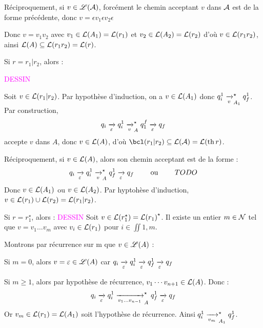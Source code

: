 \documentclass[a4paper,french,bookmarks]{book}
\begin{document}
\begin{nproof}
\begin{enumerate}
        
        Réciproquement, si $v\in \mathscr{L}(\mathcal{A})$, forcément le chemin acceptant $v$ dans $\mathcal{A}$ est de la forme précédente, donc $v= \epsilon v_1 \epsilon v_2  \epsilon $
        
        
        Donc $v = v_1v_2$ avec $v_1 \in \mathcal{L}\!\left(A_1\right) = \mathcal{L}\!\left(r_1\right)$ et $v_2 \in \mathcal{L}\!\left(A_2\right) = \mathcal{L}\!\left(r_2\right)$ d'où $v \in \mathcal{L}\!\left(r_1r_2\right)$, ainsi $\mathcal{L}\!\left(A\right) \subseteq \mathcal{L}\!\left(r_1r_2\right) = \mathcal{L}\!\left(r\right)$.
        
            \itt Si $r = r_1 \vert r_2$, alors :
            
            \textcolor{magenta}{DESSIN}
            
            Soit $v \in \mathcal{L}\!\left(r_1 \vert r_2\right)$. Par hypothèse d'induction, on a $v \in \mathcal{L}\!\left(A_1\right)$ donc $q_i^1 \lima{v}_{A_1}^\star q_f^1$. Par construction, 
            \[ q_i \lima{\epsilon} q_i^1 \lima{v}_A^\star q_1^f \lima{\epsilon} q_f\]
            accepte $v$ dans $A$, donc $v \in \mathcal{L}\!\left(A\right)$, d'où $\bcl\p{r_1 \vert r_2} \subseteq \bcL\p{\bcA} = \bcL\p{\th r}$.
            
            Réciproquement, si $v \in \mathcal{L}\!\left(A\right)$, alors son chemin acceptant est de la forme :
            \[ q_i \lima{\epsilon} q_i^1 \lima{v}_{A}^\star q_f^1 \lima{\epsilon} q_f \qquad\ou\qquad TODO\]
            Donc $v \in \mathcal{L}\!\left(A_1\right)$ ou $v \in \mathcal{L}\!\left(A_2\right)$. Par hyptohèse d'induction, $v \in \mathcal{L}\!\left(r_1\right) \cup \mathcal{L}\!\left(r_2\right) = \mathcal{L}\!\left(r_1 \vert r_2\right)$.
            
            \itt Si $r = r_1^\star$, alors :
            \textcolor{magenta}{\Huge{DESSIN}}
            Soit $v \in \mathcal{L}\!\left(r_1^\star\right) = \mathcal{L}\!\left(r_1\right)^\star$. Il existe un entier $m \in \mathcal{N}$ tel que $v = v_1 \dots v_m$ avec $v_i \in \mathcal{L}\!\left(r_1\right)$ pour $i \in \iint{1, m}$.
            
            Montrons par récurrence sur m que $v \in \mathscr{L} \!\left(A\right)$ :
            \begin{enumerate}
                \ithand Si $m = 0$, alors $v = \varepsilon \in \mathscr{L} \!\left(A\right)$ car $q_i \lima{\epsilon} q_i^1 \lima{\epsilon} q_f^1 \lima{\epsilon}  q_f$
                    
                \ithand Si $m \geq 1$, alors par hypothèse de récurrence, $v_1\cdots v_{n+1} \in \mathcal{L}\!\left(A\right)$. Donc :
                \[ q_i \lima{\epsilon} q_i^1 \lima{v_1\dots v_{n-1}}_A^\star q_f^1 \lima{\epsilon} q_f\]
                Or $v_m \in \mathcal{L}\!\left(r_1\right) = \mathcal{L}\!\left(A_1\right)$ soit l'hypothèse de récurrence. Ainsi $q_i^1 \lima{v_m}_{A_1}^\star q_f^1$.
            \end{enumerate}
                

\end{enumerate}
\end{nproof}
\end{document}
